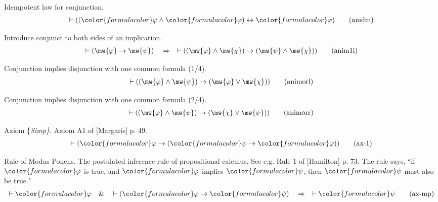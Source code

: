 \begin{lemma} {Idempotent law for conjunction.}  
\begin{align}
\vdash ( ( {\color{formulacolor}\varphi} \wedge {\color{formulacolor}\varphi} )
    \leftrightarrow {\color{formulacolor}\varphi} )\label{eq:anidm}\tag{anidm}
\end{align}
\end{lemma}


\begin{lemma} {Introduce conjunct to both sides of an
implication.}
\begin{align}
\vdash ( \mw{\varphi} \rightarrow \mw{\psi} )\quad\Rightarrow\quad \vdash ( (
    \mw{\varphi} \wedge \mw{\chi} ) \rightarrow ( \mw{\psi} \wedge \mw{\chi} )
    )\label{eq:anim1i}\tag{anim1i}
\end{align}
\end{lemma}


\begin{lemma} {Conjunction implies disjunction with one
common formula (1/4).}
\begin{align}
\vdash ( ( \mw{\varphi} \wedge \mw{\psi} ) \rightarrow ( \mw{\varphi} \vee
    \mw{\chi} ) )\label{eq:animorl}\tag{animorl}
\end{align}
\end{lemma}


\begin{lemma} {Conjunction implies disjunction with one
common formula (2/4).}
\begin{align}
\vdash ( ( \mw{\varphi} \wedge \mw{\psi} ) \rightarrow ( \mw{\chi} \vee
    \mw{\psi} ) )\label{eq:animorr}\tag{animorr}
\end{align}
\end{lemma}


\begin{lemma} {Axiom \{\em Simp\}.}  Axiom A1 of [Margaris] p.
49.  
\begin{align}
\vdash ( {\color{formulacolor}\varphi} \rightarrow ( {\color{formulacolor}\psi}
    \rightarrow {\color{formulacolor}\varphi} ) )\label{eq:ax-1}\tag{ax-1}
\end{align}
\end{lemma}


\begin{lemma} {Rule of Modus Ponens.}  The postulated inference
rule of propositional
       calculus.  See e.g.  Rule 1 of [Hamilton] p. 73.  The rule says, ``if
       ${\color{formulacolor}\varphi}$ is true, and
${\color{formulacolor}\varphi}$ implies ${\color{formulacolor}\psi}$, then
${\color{formulacolor}\psi}$ must also be
       true."  
  \begin{align}
\vdash {\color{formulacolor}\varphi}\quad\&\quad \vdash (
    {\color{formulacolor}\varphi} \rightarrow {\color{formulacolor}\psi}
    )\quad\Rightarrow\quad \vdash {\color{formulacolor}\psi}\label{eq:ax-mp}\tag{ax-mp}
\end{align}
\end{lemma}


